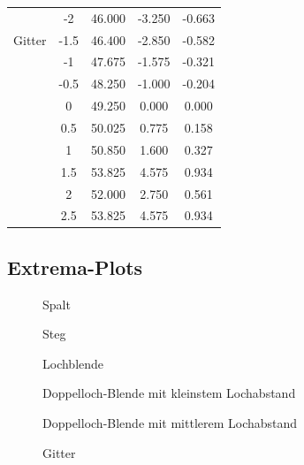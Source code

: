\documentclass[12pt,a4paper,titlepage,headinclude,bibtotoc]{scrartcl}
\begin{document}
\begin{table}[!htb]
\begin{tabular}{|c||c|c|c|c|}
		&	-2	&	46.000	&	-3.250	&	-0.663	\\
		Gitter &	-1.5	&	46.400	&	-2.850	&	-0.582	\\
		&	-1	&	47.675	&	-1.575	&	-0.321	\\
		&	-0.5	&	48.250	&	-1.000	&	-0.204	\\
		&	0	&	49.250	&	0.000	&	0.000	\\
		&	0.5	&	50.025	&	0.775	&	0.158	\\
		&	1	&	50.850	&	1.600	&	0.327	\\
		&	1.5	&	53.825	&	4.575	&	0.934	\\
		&	2	&	52.000	&	2.750	&	0.561	\\
		&	2.5	&	53.825	&	4.575	&	0.934	\\
		\hline
	\end{tabular}
\end{table}

\subsection{Extrema-Plots}
\begin{figure}[!htb]
	\centering
	
	\caption{Spalt}
\end{figure}

\begin{figure}[!htb]
	\centering
	
	\caption{Steg}
\end{figure}

\begin{figure}[!htb]
	\centering
	
	\caption{Lochblende}
\end{figure}

\begin{figure}[!htb]
	\centering
	
	\caption{Doppelloch-Blende mit kleinstem Lochabstand}
\end{figure}

\begin{figure}[!htb]
	\centering
	
	\caption{Doppelloch-Blende mit mittlerem Lochabstand}
\end{figure}

\begin{figure}[!htb]
	\centering
	
	\caption{Gitter}
\end{figure}




\end{document}
